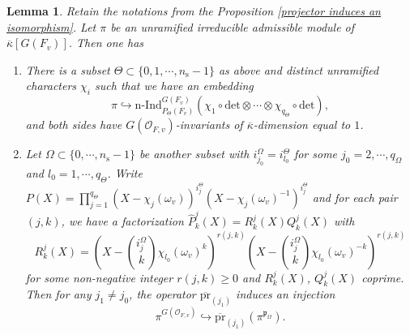 \documentclass[12pt,oneside,reqno]{amsart}
\theoremstyle{plain}
\newtheorem{lemma}[theorem]{Lemma}
\begin{document}
	
	
	
	
	\begin{lemma}\label{Lemma 1.30}
		Retain the notations from the Proposition \ref{projector induces an isomorphism}. Let $\pi$ be an unramified irreducible admissible module of
		$\overline{\kappa}[ G(F_v)]$. Then one has
		\begin{enumerate}
			\item 
			There is
			a subset
			$\Theta\subset
			\{0,1,\cdots,n_\mathrm{s}-1\}$
			as above
			and
			distinct unramified characters
			$\chi_i$
			such that we have an embedding
			\[
			\pi
			\hookrightarrow
			\mathrm{n}\text{-}\mathrm{Ind}_{P_\Theta(F_v)}^{ G(F_v)}
			\left(
			\chi_1\circ\mathrm{det}\otimes
			\cdots
			\otimes
			\chi_{q_\Theta}\circ\mathrm{det}
			\right),
			\]
			and
			both sides have $ G(\mathcal{O}_{F,v})$-invariants of
			$\overline{\kappa}$-dimension
			equal to $1$.
			
			
			\item
			Let $\Omega\subset
			\{0,\cdots,n_\mathrm{s}-1\}$
			be another subset with
			$i_{j_0}^\Omega=i_{l_0}^\Theta$
			for some $j_0=2,\cdots,q_\Omega$
			and $l_0=1,\cdots,q_\Theta$.
			Write
			$P(X)
			=
			\prod_{j=1}^{q_\Theta}
			(X-\chi_j(\omega_v))^{i^\Theta_j}
			(X-\chi_j(\omega_v)^{-1})^{i^\Theta_j}$
			and for each pair
			$(j,k)$,
			we have a factorization
			$\widehat{P}_k^j
			(X)
			=
			R_k^j(X)
			Q_k^j(X)$
			with
			\[
			R_k^j(X)
			=
			\left(
			X-\binom{i_j^\Omega}{k}\chi_{l_0}(\omega_v)^k
			\right)^{r(j,k)}
			\left(
			X-\binom{i_j^\Omega}{k}\chi_{l_0}(\omega_v)^{-k}
			\right)^{r(j,k)}
			\]
			for some non-negative integer
			$r(j,k)\ge0$
			and
			$R_k^j(X)$,
			$Q_k^j(X)$
			coprime.
			Then
			for any
			$j_1\ne j_0$,
			the operator
			$\overline{\mathrm{pr}}_{(j_1)}$
			induces an injection
			\[
			\pi^{ G(\mathcal{O}_{F,v})}
			\hookrightarrow
			\overline{\mathrm{pr}}_{(j_1)}(\pi^{\mathfrak{p}_\Omega}).
			\]
		\end{enumerate}
		
	\end{lemma}
\end{document}
